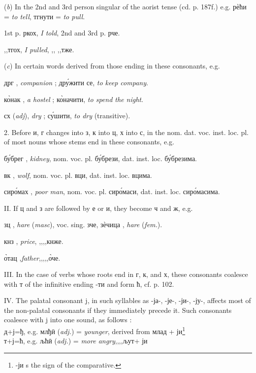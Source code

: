 ({\it b}) In the 2nd and 3rd person singular of the aorist tense (cd. p. 187f.) e.g. р\`{е}ћи = \emph{to tell}, тгнути = \emph{to pull}.

1st p. ркох, \emph{I told}, \quad 2nd and 3rd p. рче. 

\quad,,\quad тгох, \emph{I pulled}, \quad,, \quad \qquad,,\qquad тже.

({\it c}) In certain words derived from those ending in these consonants, e.g.

дрг \masc{}, \emph{companion} ; др\'{у}жити се, \emph{to keep company}.

к\`{о}нак \masc{}, \emph{a hostel} ; к\`{о}начити, \emph{to spend the night}.

сх ({\it adj}), \emph{dry} ; с\'{у}шити, \emph{to dry} (transitive). 

2. Before и, г changes into з, к into ц, х into с, in the nom. dat. voc. inst.
loc. pl. of most nouns whose stems end in these consonants, e.g.

б\'{у}брег \masc{}, \emph{kidney}, nom. voc. pl. б\'{у}брези, dat. inst. loc. б\'{у}брезима. 

вк \masc{}, \emph{wolf}, nom. voc. pl. вци, dat. inst. loc. вцима.  

сир\'{о}мах \masc{}, \emph{poor man}, nom. voc. pl. сир\'{о}маси, dat. inst. loc. сир\'{о}масима.

II. If ц and з are followed by е or и, they become ч and ж, e.g.

зц \masc{}, \emph{hare} ({\it masc}), voc. sing. зче, з\`{е}чица \femn{}, \emph{hare} ({\it fem.}).

кнз \masc{}, \emph{price}, \qquad,,\quad,,\quad кнже.

\`{о}тац \masc{},\emph{father},\qquad,,\quad,,\quad \`{о}че.

III. In the case of verbs whose roots end in г, к, and х, these consonants
coalesce with т of the infinitive ending -ти and form ћ, cf. p. 102.


IV. The palatal consonant j, in such syllables as -ја-, -је-, -ји-, -ју-,
affects most of the non-palatal consonants if they immediately precede it. Such
consonants coalesce with j into one sound, as follows :\\ 
д+ј=ђ, e.g. млђ\={и} ({\it adj.}) = \emph{younger}, derived from млад +
ји\footnote{-ји s the sign of the comparative.}\\ 
т+ј=ћ, e.g. љћ\={и} ({\it adj.}) = \emph{more angry}\quad,,\qquad,,\quad љут\quad\hspace*{-2pt}+ ји

